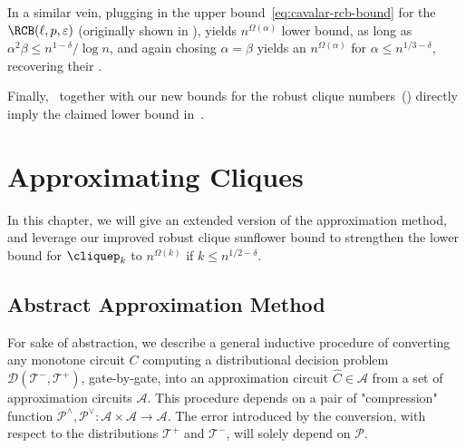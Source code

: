 In a similar vein, plugging in the upper bound~\eqref{eq:cavalar-rcb-bound} for the $\RCB(\ell, p, \varepsilon)$ (originally shown in \cite[Lemma 3.2]{cavalar2022}), yields $n^{\Omega(\alpha)}$ lower bound, as long as $\alpha^2 \beta \leq n^{1-\delta}/\log n$, and again chosing $\alpha=\beta$ yields an $n^{\Omega(\alpha)}$ for $\alpha \leq n^{1/3 - \delta}$, recovering their \cite[Theorem 3.23]{cavalar2022}.

Finally,~ together with our new bounds for the robust clique numbers~() directly imply the claimed lower bound in~.

\section{Approximating Cliques \label{sec:approximation-method}}

In this chapter, we will give an extended version of the approximation method, and leverage our improved robust clique sunflower bound to strengthen the lower bound for $\cliquep_k$ to $n^{\Omega(k)}$ if $k\leq n^{1/2 -\delta }$.

\subsection{Abstract Approximation Method}




For sake of abstraction, we describe a general inductive procedure of converting any monotone circuit $C$ computing a distributional decision problem $\mathcal{D}(\mathcal{T}^-, \mathcal{T}^+)$, gate-by-gate, into an approximation circuit $\hat{C} \in \mathcal{A}$ from a set of approximation circuits $\mathcal{A}$. This procedure depends on a pair of "compression" function $\mathcal{P}^{\land}, \mathcal{P}^{\lor}: \mathcal{A} \times \mathcal{A} \rightarrow \mathcal{A}$. The error introduced by the conversion, with respect to the distributions $\mathcal{T}^+$ and $\mathcal{T^-}$, will solely depend on $\mathcal{P}$.


